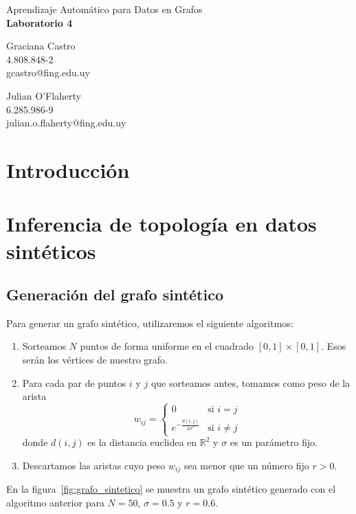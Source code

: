 \documentclass{article}
\begin{document}
\begin{center}
    {\Large Aprendizaje Automático para Datos en Grafos} \\
    {\LARGE \textbf{Laboratorio 4}} \\
    \vspace{2em}
    \begin{minipage}{0.45\textwidth}
        \centering
        Graciana Castro \\
        4.808.848-2 \\
        gcastro@fing.edu.uy
    \end{minipage}
    \hfill
    \begin{minipage}{0.45\textwidth}
        \centering
        Julian O'Flaherty \\
        6.285.986-9 \\
        julian.o.flaherty@fing.edu.uy
    \end{minipage}
\end{center}


\section{Introducción}

\section{Inferencia de topología en datos sintéticos}

\subsection{Generación del grafo sintético}

Para generar un grafo sintético, utilizaremos el siguiente algoritmos:
\begin{enumerate}
    \item Sorteamos $N$ puntos de forma uniforme en el cuadrado $[0,1] \times [0,1]$. Esos serán los vértices de nuestro grafo.
    \item Para cada par de puntos $i$ y $j$ que sorteamos antes, tomamos como peso de la arista
    \begin{equation*}
        w_{ij} = \begin{cases}
            0 & \text{si } i=j \\
            e^{-\frac{d(i,j)}{2\sigma^2}} & \text{si } i \neq j
        \end{cases}
    \end{equation*}
    donde $d(i,j)$ es la distancia euclidea en $\mathbb{R}^2$ y $\sigma$ es un parámetro fijo.
    \item Descartamos las aristas cuyo peso $w_{ij}$ sea menor que un número fijo $r>0$.
\end{enumerate}
En la figura~\ref{fig:grafo_sintetico} se muestra un grafo sintético generado con el algoritmo anterior para $N=50$, $\sigma=0.5$ y $r=0.6$.
\end{document}
